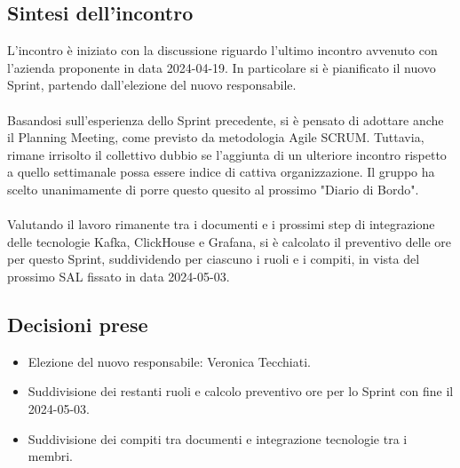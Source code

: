 \documentclass[8pt]{article}
\begin{document}
\subsection{Sintesi dell'incontro}
L'incontro è iniziato con la discussione riguardo l'ultimo incontro avvenuto con l'azienda proponente in data 2024-04-19. In particolare si è pianificato il nuovo Sprint, partendo dall'elezione del nuovo responsabile. \\~\\Basandosi sull'esperienza dello Sprint precedente, si è pensato di adottare anche il Planning Meeting, come previsto da metodologia Agile SCRUM. Tuttavia, rimane irrisolto il collettivo dubbio se l'aggiunta di un ulteriore incontro rispetto a quello settimanale possa essere indice di cattiva organizzazione. Il gruppo ha scelto unanimamente di porre questo quesito al prossimo "Diario di Bordo". \\~\\Valutando il lavoro rimanente tra i documenti e i prossimi step di integrazione delle tecnologie Kafka, ClickHouse e Grafana, si è calcolato il preventivo delle ore per questo Sprint, suddividendo per ciascuno i ruoli e i compiti, in vista del prossimo SAL fissato in data 2024-05-03.
\subsection{Decisioni prese}
\begin{itemize}
	\setlength\itemsep{0em}
	\item Elezione del nuovo responsabile: Veronica Tecchiati.
	\item Suddivisione dei restanti ruoli e calcolo preventivo ore per lo Sprint con fine il 2024-05-03.
	\item Suddivisione dei compiti tra documenti e integrazione tecnologie tra i membri.
\end{itemize}
\newpage
\end{document}
